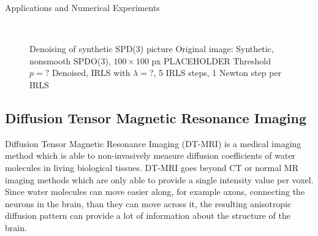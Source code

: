 \begin{chapter}{Applications and Numerical Experiments}
\begin{figure}[h!]
{    }
    \\
    \caption[Denoising of synthetic SPD(3) picture]{Denoising of synthetic SPD(3) picture
	 Original image: Synthetic, nonsmooth SPDO(3), $100\times 100$ px PLACEHOLDER
	 Threshold $p=?$
	 Denoised, IRLS with $\lambda=?$, 5 IRLS steps, 1 Newton step per IRLS
	\label{fig:application_spd1}
    }
\end{figure}


\FloatBarrier
\subsection{Diffusion Tensor Magnetic Resonance Imaging} %
\label{sub:Diffusion Tensor MRI images}
Diffusion Tensor Magnetic Resonance Imaging (DT-MRI) is a medical imaging method which is able to non-invasively measure diffusion coefficients of water molecules
in living biological tissues. DT-MRI goes beyond CT or normal MR imaging methods which are only able to provide a single intensity value per voxel. Since water molecules
can move easier along, for example axons, connecting the neurons in the brain, than they can move across it, the resulting anisotropic diffusion pattern can provide a
lot of information about the structure of the brain.\\


\end{chapter}

